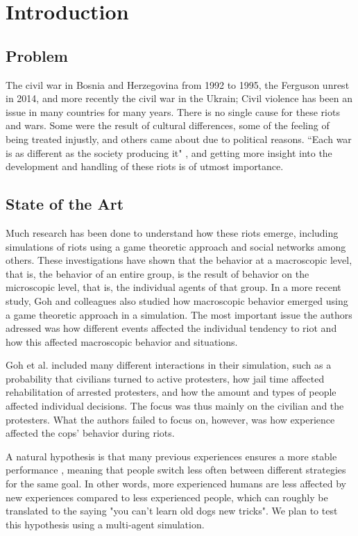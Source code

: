\section{Introduction}
\subsection{Problem}
The civil war in Bosnia and Herzegovina from 1992 to 1995, the Ferguson unrest in 2014, and more recently the civil war in the Ukrain; Civil violence has been an issue in many countries for many years.
There is no single cause for these riots and wars.
Some were the result of cultural differences, some of the feeling of being treated injustly, and others came about due to political reasons.
``Each war is as different as the society producing it" \citep*{sambanis2001ethnic}, and getting more insight into the development and handling of these riots is of utmost importance.


\subsection{State of the Art}
Much research has been done to understand how these riots emerge, including simulations of riots using a game theoretic approach \citep*{myerson1991game} and social networks \citep*{gulden2002spatial} among others.
These investigations have shown that the behavior at a macroscopic level, that is, the behavior of an entire group, is the result of behavior on the microscopic level, that is, the individual agents of that group.
In a more recent study, Goh and colleagues \citep*{goh2006modeling} also studied how macroscopic behavior emerged using a game theoretic approach in a simulation.
The most important issue the authors adressed was how different events affected the individual tendency to riot and how this affected macroscopic behavior and situations.


Goh et al. included many different interactions in their simulation, such as a probability that civilians turned to active protesters, how jail time affected rehabilitation of arrested protesters, and how the amount and types of people affected individual decisions. The focus was thus mainly on the civilian and the protesters. What the authors failed to focus on, however, was how experience affected the cops' behavior during riots.

A natural hypothesis is that many previous experiences ensures a more stable performance \citep{anderson2007mind,nason2005soar}, meaning that people switch less often between different strategies for the same goal. In other words, more experienced humans are less affected by new experiences compared to less experienced people, which can roughly be translated to the saying "you can't learn old dogs new tricks". We plan to test this hypothesis using a multi-agent simulation.

